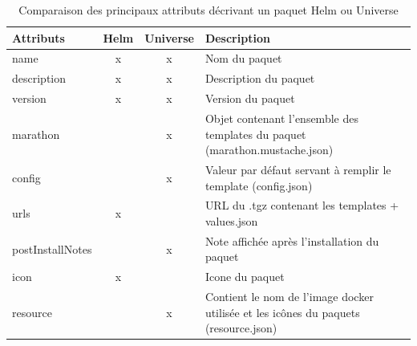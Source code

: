 \documentclass[11pt,fleqn]{book} %
\begin{document}
\begin{table}[H]
\hspace{-1.8cm}
\begin{tabular}{@{}lccl@{}}
\toprule
Attributs        & \multicolumn{1}{l}{Helm} & \multicolumn{1}{l}{Universe} & Description                                                                 \\ \midrule
name             & x                        & x                            & Nom du paquet                                                               \\
description      & x                        & x                            & Description du paquet                                                       \\
version          & x                        & x                            & Version du paquet                                                           \\
marathon         &                          & x                            & Objet contenant l'ensemble des templates du paquet (marathon.mustache.json) \\
config           &                          & x                            & Valeur par défaut servant à remplir le template (config.json)               \\
urls             & x                        &                              & URL du .tgz contenant les templates + values.json                            \\
postInstallNotes &                          & x                            & Note affichée après l'installation du paquet                               \\
icon             & x                        &                              & Icone du paquet                                                            \\
resource         &                          & x                            & Contient le nom de l'image docker utilisée et les icônes du paquets (resource.json)        \\ \bottomrule
\end{tabular}
\caption{Comparaison des principaux attributs décrivant un paquet Helm ou Universe \newline}
\label{tab:my-table}
\end{table}
\end{document}
